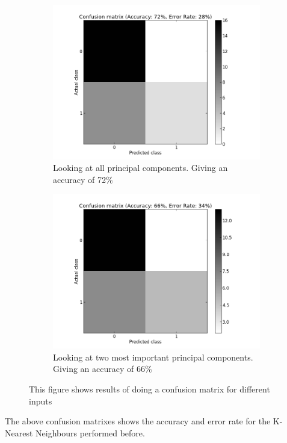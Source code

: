 \begin{figure}[H]
	\begin{subfigure}[b]{0.5\textwidth}
	\includegraphics[scale=0.2]{pictures/cmPC.png}
	\caption{Looking at all principal components. \newline Giving an accuracy of 72\%}
	\label{cmResultXPA}
	\end{subfigure}
	\begin{subfigure}[b]{0.5\textwidth}
	\includegraphics[scale=0.2]{pictures/cm2PC.png}
	\caption{Looking at two most important principal components.  Giving an accuracy of 66\%}
	\label{cmX2PA}
	\end{subfigure}
\caption{This figure shows results of doing a confusion matrix for different inputs}
\label{cmResults}
\end{figure}
The above confusion matrixes shows the accuracy and error rate for the K-Nearest Neighbours performed before.

